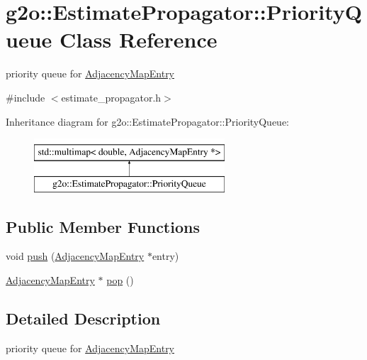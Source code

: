 \hypertarget{classg2o_1_1_estimate_propagator_1_1_priority_queue}{}\section{g2o\+:\+:Estimate\+Propagator\+:\+:Priority\+Queue Class Reference}
\label{classg2o_1_1_estimate_propagator_1_1_priority_queue}


priority queue for \mbox{\hyperlink{classg2o_1_1_estimate_propagator_1_1_adjacency_map_entry}{Adjacency\+Map\+Entry}}  




{\ttfamily \#include $<$estimate\+\_\+propagator.\+h$>$}

Inheritance diagram for g2o\+:\+:Estimate\+Propagator\+:\+:Priority\+Queue\+:\begin{figure}[H]
\begin{center}
\leavevmode
\includegraphics[height=2.000000cm]{classg2o_1_1_estimate_propagator_1_1_priority_queue}
\end{center}
\end{figure}
\subsection*{Public Member Functions}
\begin{DoxyCompactItemize}
\item 
void \mbox{\hyperlink{classg2o_1_1_estimate_propagator_1_1_priority_queue_ac89681b92b921412ff432f14028f481e}{push}} (\mbox{\hyperlink{classg2o_1_1_estimate_propagator_1_1_adjacency_map_entry}{Adjacency\+Map\+Entry}} $\ast$entry)
\item 
\mbox{\hyperlink{classg2o_1_1_estimate_propagator_1_1_adjacency_map_entry}{Adjacency\+Map\+Entry}} $\ast$ \mbox{\hyperlink{classg2o_1_1_estimate_propagator_1_1_priority_queue_a82a20f1ebc44dfe305f65ceae7860a85}{pop}} ()
\end{DoxyCompactItemize}


\subsection{Detailed Description}
priority queue for \mbox{\hyperlink{classg2o_1_1_estimate_propagator_1_1_adjacency_map_entry}{Adjacency\+Map\+Entry}} 


